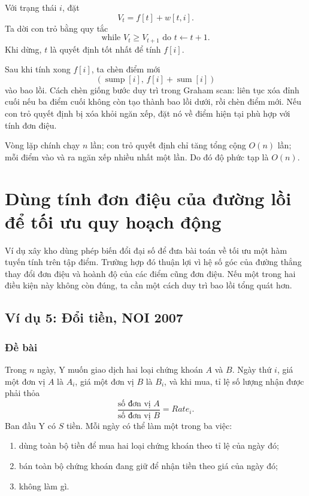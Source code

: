 \documentclass[11pt]{article}
\newcommand{\sump}{\operatorname{sump}}
\newcommand{\sumx}{\operatorname{sum}}
\begin{document}
Với trạng thái $i$, đặt
\[
  V_t=f[t]+w[t,i].
\]
Ta dời con trỏ bằng quy tắc
\[
  \text{while } V_t\ge V_{t+1}\text{ do }t\leftarrow t+1.
\]
Khi dừng, $t$ là quyết định tốt nhất để tính $f[i]$.

Sau khi tính xong $f[i]$, ta chèn điểm mới
\[
  (\sump[i],\,f[i]+\sumx[i])
\]
vào bao lồi. Cách chèn giống bước duy trì trong Graham scan: liên tục xóa
đỉnh cuối nếu ba điểm cuối không còn tạo thành bao lồi dưới, rồi chèn điểm
mới. Nếu con trỏ quyết định bị xóa khỏi ngăn xếp, đặt nó về điểm hiện tại
phù hợp với tính đơn điệu.

Vòng lặp chính chạy $n$ lần; con trỏ quyết định chỉ tăng tổng cộng $O(n)$ lần;
mỗi điểm vào và ra ngăn xếp nhiều nhất một lần. Do đó độ phức tạp là $O(n)$.

\section{Dùng tính đơn điệu của đường lồi để tối ưu quy hoạch động}

Ví dụ xây kho dùng phép biến đổi đại số để đưa bài toán về tối ưu một hàm
tuyến tính trên tập điểm. Trường hợp đó thuận lợi vì hệ số góc của đường
thẳng thay đổi đơn điệu và hoành độ của các điểm cũng đơn điệu. Nếu một trong
hai điều kiện này không còn đúng, ta cần một cách duy trì bao lồi tổng quát
hơn.

\subsection{Ví dụ 5: Đổi tiền, NOI 2007}

\subsubsection*{Đề bài}

Trong $n$ ngày, Y muốn giao dịch hai loại chứng khoán $A$ và $B$. Ngày thứ
$i$, giá một đơn vị $A$ là $A_i$, giá một đơn vị $B$ là $B_i$, và khi mua,
tỉ lệ số lượng nhận được phải thỏa
\[
  \frac{\text{số đơn vị }A}{\text{số đơn vị }B}=Rate_i.
\]
Ban đầu Y có $S$ tiền. Mỗi ngày có thể làm một trong ba việc:

\begin{enumerate}
  \item dùng toàn bộ tiền để mua hai loại chứng khoán theo tỉ lệ của ngày đó;
  \item bán toàn bộ chứng khoán đang giữ để nhận tiền theo giá của ngày đó;
  \item không làm gì.
\end{enumerate}
\end{document}
